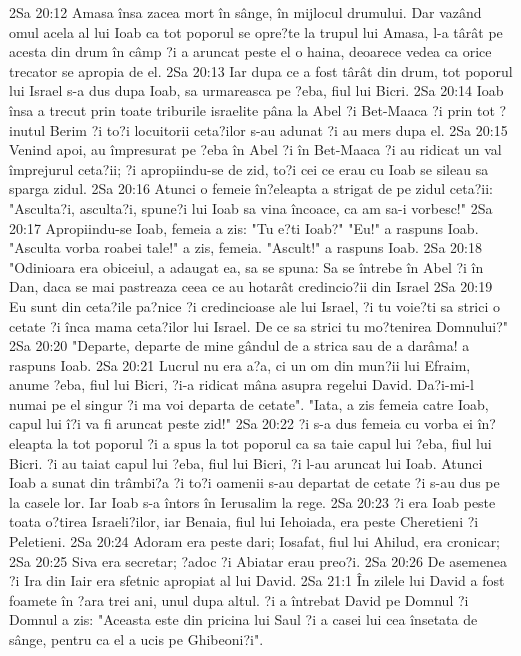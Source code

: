 2Sa 20:12  Amasa însa zacea mort în sânge, în mijlocul drumului. Dar vazând omul acela al lui Ioab ca tot poporul se opre?te la trupul lui Amasa, l-a târât pe acesta din drum în câmp ?i a aruncat peste el o haina, deoarece vedea ca orice trecator se apropia de el.
2Sa 20:13  Iar dupa ce a fost târât din drum, tot poporul lui Israel s-a dus dupa Ioab, sa urmareasca pe ?eba, fiul lui Bicri.
2Sa 20:14  Ioab însa a trecut prin toate triburile israelite pâna la Abel ?i Bet-Maaca ?i prin tot ?inutul Berim ?i to?i locuitorii ceta?ilor s-au adunat ?i au mers dupa el.
2Sa 20:15  Venind apoi, au împresurat pe ?eba în Abel ?i în Bet-Maaca ?i au ridicat un val împrejurul ceta?ii; ?i apropiindu-se de zid, to?i cei ce erau cu Ioab se sileau sa sparga zidul.
2Sa 20:16  Atunci o femeie în?eleapta a strigat de pe zidul ceta?ii: "Asculta?i, asculta?i, spune?i lui Ioab sa vina încoace, ca am sa-i vorbesc!"
2Sa 20:17  Apropiindu-se Ioab, femeia a zis: "Tu e?ti Ioab?" "Eu!" a raspuns Ioab. "Asculta vorba roabei tale!" a zis, femeia. "Ascult!" a raspuns Ioab.
2Sa 20:18  "Odinioara era obiceiul, a adaugat ea, sa se spuna: Sa se întrebe în Abel ?i în Dan, daca se mai pastreaza ceea ce au hotarât credincio?ii din Israel
2Sa 20:19  Eu sunt din ceta?ile pa?nice ?i credincioase ale lui Israel, ?i tu voie?ti sa strici o cetate ?i înca mama ceta?ilor lui Israel. De ce sa strici tu mo?tenirea Domnului?"
2Sa 20:20  "Departe, departe de mine gândul de a strica sau de a darâma! a raspuns Ioab.
2Sa 20:21  Lucrul nu era a?a, ci un om din mun?ii lui Efraim, anume ?eba, fiul lui Bicri, ?i-a ridicat mâna asupra regelui David. Da?i-mi-l numai pe el singur ?i ma voi departa de cetate". "Iata, a zis femeia catre Ioab, capul lui î?i va fi aruncat peste zid!"
2Sa 20:22  ?i s-a dus femeia cu vorba ei în?eleapta la tot poporul ?i a spus la tot poporul ca sa taie capul lui ?eba, fiul lui Bicri. ?i au taiat capul lui ?eba, fiul lui Bicri, ?i l-au aruncat lui Ioab. Atunci Ioab a sunat din trâmbi?a ?i to?i oamenii s-au departat de cetate ?i s-au dus pe la casele lor. Iar Ioab s-a întors în Ierusalim la rege.
2Sa 20:23  ?i era Ioab peste toata o?tirea Israeli?ilor, iar Benaia, fiul lui Iehoiada, era peste Cheretieni ?i Peletieni.
2Sa 20:24  Adoram era peste dari; Iosafat, fiul lui Ahilud, era cronicar;
2Sa 20:25  Siva era secretar; ?adoc ?i Abiatar erau preo?i.
2Sa 20:26  De asemenea ?i Ira din Iair era sfetnic apropiat al lui David.
2Sa 21:1  În zilele lui David a fost foamete în ?ara trei ani, unul dupa altul. ?i a întrebat David pe Domnul ?i Domnul a zis: "Aceasta este din pricina lui Saul ?i a casei lui cea însetata de sânge, pentru ca el a ucis pe Ghibeoni?i".
